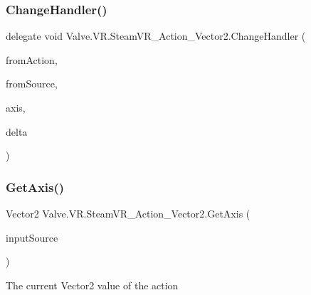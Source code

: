 \mbox{\label{class_valve_1_1_v_r_1_1_steam_v_r___action___vector2_ad390de62736aedd5be93238b1840ffec}} 
\subsubsection{\texorpdfstring{ChangeHandler()}{ChangeHandler()}}
{\footnotesize\ttfamily delegate void Valve.\+V\+R.\+Steam\+V\+R\+\_\+\+Action\+\_\+\+Vector2.\+Change\+Handler (\begin{DoxyParamCaption}\item[{\mbox{\hyperlink{class_valve_1_1_v_r_1_1_steam_v_r___action___vector2}{Steam\+V\+R\+\_\+\+Action\+\_\+\+Vector2}}}]{from\+Action,  }\item[{\mbox{\hyperlink{namespace_valve_1_1_v_r_a82e5bf501cc3aa155444ee3f0662853f}{Steam\+V\+R\+\_\+\+Input\+\_\+\+Sources}}}]{from\+Source,  }\item[{Vector2}]{axis,  }\item[{Vector2}]{delta }\end{DoxyParamCaption})}

\mbox{\label{class_valve_1_1_v_r_1_1_steam_v_r___action___vector2_a9313e35bdbdfc18a161484bdd0c8239b}} 
\subsubsection{\texorpdfstring{GetAxis()}{GetAxis()}}
{\footnotesize\ttfamily Vector2 Valve.\+V\+R.\+Steam\+V\+R\+\_\+\+Action\+\_\+\+Vector2.\+Get\+Axis (\begin{DoxyParamCaption}\item[{\mbox{\hyperlink{namespace_valve_1_1_v_r_a82e5bf501cc3aa155444ee3f0662853f}{Steam\+V\+R\+\_\+\+Input\+\_\+\+Sources}}}]{input\+Source }\end{DoxyParamCaption})}



The current Vector2 value of the action 


